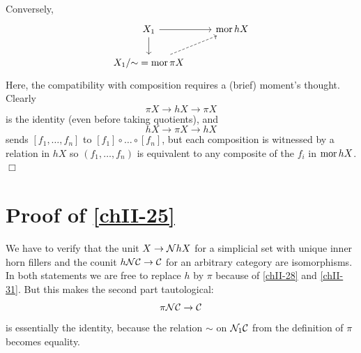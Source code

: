         Conversely,
        \begin{equation*}
            \begin{tikzcd}
                X_1 \arrow[r] \arrow[d] & \mor hX \\
                {X_1}/{\sim} = \mor \pi X \arrow[ur, dashed]
            \end{tikzcd}
        \end{equation*}
        Here, the compatibility with composition requires a (brief) moment's thought. Clearly
        \begin{equation*}
            \pi X \to hX \to \pi X
        \end{equation*}
        is the identity (even before taking quotients), and
        \begin{equation*}
            hX \to \pi X \to hX
        \end{equation*}
        sends $\left[ f_1, \ldots, f_n \right]$ to $\left[ f_1 \right] \circ \ldots \circ \left[ f_n \right]$, but each composition is witnessed by a relation in $hX$ so $(f_1, \ldots, f_n)$ is equivalent to any composite of the $f_i$ in $\operatorname{mor} hX$.\hfill$\Box$

    \section{Proof of \ref{chII-25}}
        We have to verify that the unit $X \to \mathcal{N} hX$ for a simplicial set with unique inner horn fillers and the counit $h\mathcal{N}\mathcal{C} \to \mathcal{C}$ for an arbitrary category are isomorphisms.
        In both statements we are free to replace $h$ by $\pi$ because of \ref{chII-28} and \ref{chII-31}. But this makes the second part tautological:
        \begin{equation*}
            \pi \mathcal{N} \mathcal{C} \to \mathcal{C}
        \end{equation*}
        is essentially the identity, because the relation $\sim$ on $\mathcal{N}_1 \mathcal{C}$ from the definition  of $\pi$ becomes equality.

